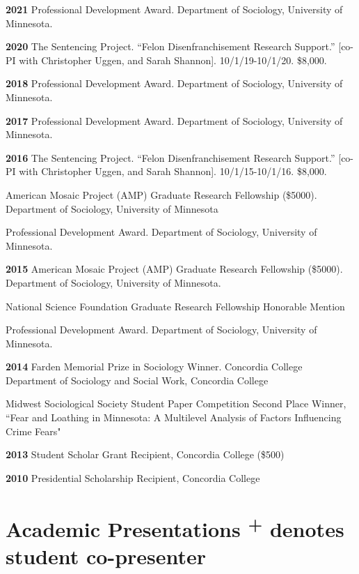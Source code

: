 \documentclass[letterpaper]{article}
\newenvironment{publist}{%
  \begin{list}{}{%
    \setlength{\leftmargin}{0cm}   %
    \setlength{\labelwidth}{2cm}     %
    \setlength{\labelsep}{0.5cm}     %
  }%
}{%
  \end{list}%
}
\begin{document}
\begin{publist}
\item[\textbf{2021}] Professional Development Award. Department of Sociology, University of Minnesota. 

\item[\textbf{2020}] The Sentencing Project. “Felon Disenfranchisement Research Support.” [co-PI with Christopher Uggen, and Sarah Shannon]. 10/1/19-10/1/20. \$8,000.

\item[\textbf{2018}] Professional Development Award. Department of Sociology, University of Minnesota. 
\item[\textbf{2017}] Professional Development Award. Department of Sociology, University of Minnesota. 
\item[\textbf{2016}] The Sentencing Project. “Felon Disenfranchisement Research Support.” [co-PI with Christopher Uggen, and Sarah Shannon]. 10/1/15-10/1/16. \$8,000.
\item American Mosaic Project (AMP) Graduate Research Fellowship (\$5000). Department of Sociology, University of Minnesota
\item Professional Development Award. Department of Sociology, University of Minnesota. 
\item[\textbf{2015}] American Mosaic Project (AMP) Graduate Research Fellowship (\$5000). Department of Sociology, University of Minnesota. 
\item National Science Foundation Graduate Research Fellowship Honorable Mention
\item Professional Development Award. Department of Sociology, University of Minnesota. 
\item[\textbf{2014}]Farden Memorial Prize in Sociology Winner. Concordia College Department of Sociology and Social Work, Concordia College
\item Midwest Sociological Society Student Paper Competition Second Place Winner,  ``Fear and Loathing in Minnesota: A Multilevel Analysis of Factors Influencing Crime Fears"
\item[\textbf{2013}] Student Scholar Grant Recipient, Concordia College (\$500)
\item[\textbf{2010}] Presidential Scholarship Recipient, Concordia College

\end{publist}



\section*{\textbf{Academic Presentations} \scriptsize{\textsuperscript{+} denotes student co-presenter}} 
\end{document}
